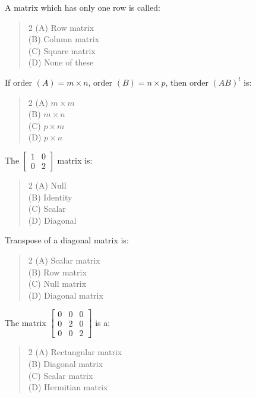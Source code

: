 \documentclass[11pt,a4paper]{article}
\begin{document}
\begin{mcqlist}
\item A matrix which has only one row is called:
\begin{quote}\begin{multicols}{2}
\noindent (A) Row matrix \\
(B) Column matrix \\
(C) Square matrix \\
(D) None of these
\end{multicols}\end{quote}

\item If order $(A)=m\times n$, order $(B)=n\times p$, then order $(AB)^t$ is:
\begin{quote}\begin{multicols}{2}
\noindent (A) $m\times m$ \\
(B) $m\times n$ \\
(C) $p\times m$ \\
(D) $p\times n$
\end{multicols}\end{quote}

\item The $\begin{bmatrix}1&0\\0&2\end{bmatrix}$ matrix is:
\begin{quote}\begin{multicols}{2}
\noindent (A) Null \\
(B) Identity \\
(C) Scalar \\
(D) Diagonal
\end{multicols}\end{quote}

\item Transpose of a diagonal matrix is:
\begin{quote}\begin{multicols}{2}
\noindent (A) Scalar matrix \\
(B) Row matrix \\
(C) Null matrix \\
(D) Diagonal matrix
\end{multicols}\end{quote}

\item The matrix $\begin{bmatrix}0&0&0\\0&2&0\\0&0&2\end{bmatrix}$ is a:
\begin{quote}\begin{multicols}{2}
\noindent (A) Rectangular matrix \\
(B) Diagonal matrix \\
(C) Scalar matrix \\
(D) Hermitian matrix
\end{multicols}\end{quote}


\end{mcqlist}
\end{document}
